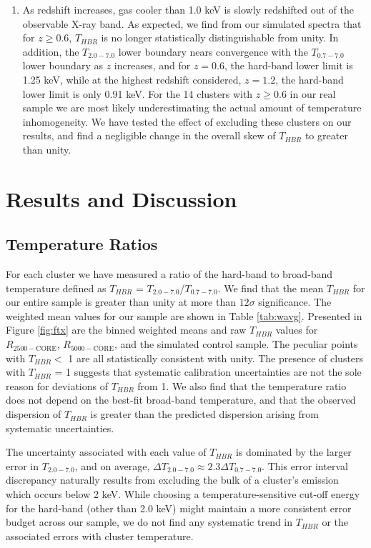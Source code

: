 \documentclass[apj]{emulateapj}
\begin{document}
\begin{enumerate}
\item As redshift increases, gas cooler than 1.0 keV is slowly
redshifted out of the observable X-ray band. As expected, we find from
our simulated spectra that for $z \geq 0.6$, $T_{HBR}$ is no longer
statistically distinguishable from unity. In addition, the
$T_{2.0-7.0}$ lower boundary nears convergence with the $T_{0.7-7.0}$
lower boundary as $z$ increases, and for $z = 0.6$, the hard-band
lower limit is 1.25 keV, while at the highest redshift considered, $z =
1.2$, the hard-band lower limit is only 0.91 keV. For the 14
clusters with $z \geq 0.6$ in our real sample we are most likely
underestimating the actual amount of temperature inhomogeneity. We
have tested the effect of excluding these clusters on our results, and
find a negligible change in the overall skew of $T_{HBR}$ to greater
than unity.
\end{enumerate}

\section{Results and Discussion} \label{sec:r&d}

\subsection{Temperature Ratios} \label{sec:tfresults}

For each cluster we have measured a ratio of the hard-band
to broad-band temperature defined as $T_{HBR}$ =
$T_{2.0-7.0}$/$T_{0.7-7.0}$. We find that the mean $T_{HBR}$ for our
entire sample is greater than unity at more than $12\sigma$
significance. The weighted mean values for our sample are shown in
Table \ref{tab:wavg}. Presented in Figure  \ref{fig:ftx} are the binned
weighted means and raw $T_{HBR}$ values for $R_{2500-\mathrm{CORE}}$,
$R_{5000-\mathrm{CORE}}$, and the simulated control sample. The peculiar
points with $T_{HBR} <$ 1 are all statistically consistent with
unity. The presence of clusters with $T_{HBR}$ = 1 suggests that
systematic calibration uncertainties are not the sole reason for
deviations of $T_{HBR}$ from 1. We also find that the temperature
ratio does not depend on the best-fit broad-band temperature, and that
the observed dispersion of $T_{HBR}$ is greater than the predicted
dispersion arising from systematic uncertainties.

The uncertainty associated with each value of $T_{HBR}$ is dominated by
the larger error in $T_{2.0-7.0}$, and on average, $\Delta T_{2.0-7.0} \approx
2.3\Delta T_{0.7-7.0}$. This error interval discrepancy naturally results
from excluding the bulk of a cluster's emission which occurs below 2
keV. While choosing a temperature-sensitive cut-off energy for the
hard-band (other than 2.0 keV) might maintain a more consistent
error budget across our sample, we do not find any systematic trend in
$T_{HBR}$ or the associated errors with cluster temperature.
\end{document}
